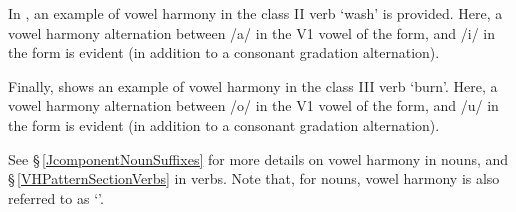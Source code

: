 In , an example of vowel harmony in the class II verb  ‘wash’ is provided. Here, a vowel harmony alternation between /a/ in the V1 vowel of the  form, and /i/ in the  form is evident (in addition to a consonant gradation alternation). 
\ea\label{vhEx2}%
\z

Finally,  shows an example of vowel harmony in the class III verb  ‘burn’. Here, a vowel harmony alternation between /o/ in the V1 vowel of the  form, and /u/ in the  form is evident (in addition to a consonant gradation alternation). 
\ea\label{vhEx3}%
\z


See §\,\ref{JcomponentNounSuffixes} for more details on vowel harmony in nouns, and §\,\ref{VHPatternSectionVerbs} in verbs. Note that, for nouns, vowel harmony is also referred to as ‘\jvh’.


\FloatBarrier



